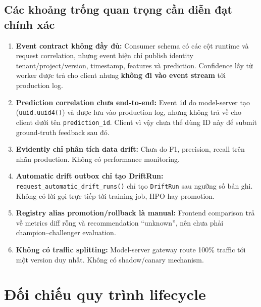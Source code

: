 \documentclass[11pt,a4paper]{article}
\newcommand{\codepath}[1]{\texttt{\small #1}}
\begin{document}
\subsection{Các khoảng trống quan trọng cần diễn đạt chính xác}
\begin{enumerate}
  \item \textbf{Event contract không đầy đủ:} Consumer schema có các cột runtime và request correlation, nhưng event hiện chỉ publish identity tenant/project/version, timestamp, features và prediction. Confidence lấy từ worker được trả cho client nhưng \textbf{không đi vào event stream} tới production log.
  \item \textbf{Prediction correlation chưa end-to-end:} Event \codepath{id} do model-server tạo (\codepath{uuid.uuid4()}) và được lưu vào production log, nhưng không trả về cho client dưới tên \codepath{prediction\_id}. Client vì vậy chưa thể dùng ID này để submit ground-truth feedback sau đó.
  \item \textbf{Evidently chỉ phân tích data drift:} Chưa đo F1, precision, recall trên nhãn production. Không có performance monitoring.
  \item \textbf{Automatic drift outbox chỉ tạo DriftRun:} \codepath{request\_automatic\_drift\_runs()} chỉ tạo \codepath{DriftRun} sau ngưỡng số bản ghi. Không có lời gọi trực tiếp tới training job, HPO hay promotion.
  \item \textbf{Registry alias promotion/rollback là manual:} Frontend comparison trả về metrics diff rỗng và recommendation ``unknown'', nên chưa phải champion--challenger evaluation.
  \item \textbf{Không có traffic splitting:} Model-server gateway route 100\% traffic tới một version duy nhất. Không có shadow/canary mechanism.
\end{enumerate}

\section{Đối chiếu quy trình lifecycle}
\end{document}
